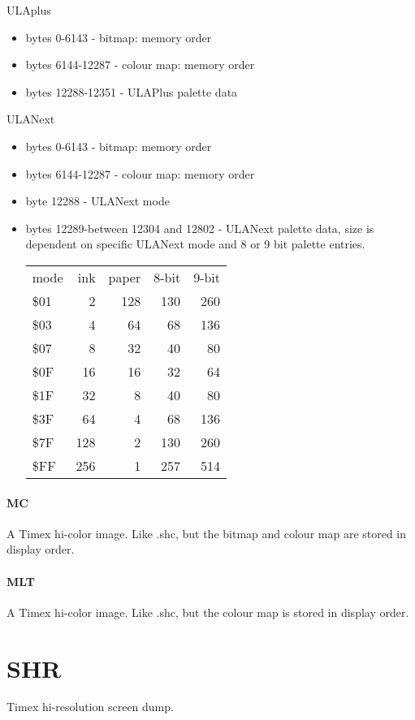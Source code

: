 ULAplus
\begin{itemize}
\item bytes 0-6143 - bitmap: memory order
\item bytes 6144-12287 - colour map: memory order
\item bytes 12288-12351 - ULAPlus palette data
\end{itemize}
ULANext
\begin{itemize}
\item bytes 0-6143 - bitmap: memory order
\item bytes 6144-12287 - colour map: memory order
\item byte 12288 - ULANext mode
\item bytes 12289-between 12304 and 12802 - ULANext palette data, size
  is dependent on specific ULANext mode and 8 or 9 bit palette entries.
  \begin{tabular}{l | r | r | r | r}
    mode & ink & paper & 8-bit & 9-bit \\
    \$01 & 2 & 128 & 130 & 260\\
    \$03 & 4 & 64 & 68 & 136\\
    \$07 & 8 & 32 & 40 & 80\\
    \$0F & 16 & 16 & 32 & 64\\
    \$1F & 32 & 8 & 40 & 80\\
    \$3F & 64 & 4 & 68 & 136\\
    \$7F & 128 & 2 & 130 & 260\\
    \$FF & 256 & 1 & 257 & 514
  \end{tabular}
\end{itemize}

\paragraph{MC}
A Timex hi-color image. Like .shc, but the bitmap and colour map are
stored in display order.

\paragraph{MLT}
A Timex hi-color image. Like .shc, but the colour map is stored in
display order.

\section{SHR}
  
Timex hi-resolution screen dump.

